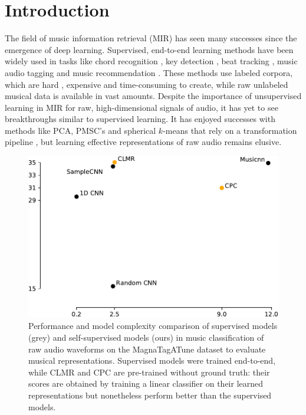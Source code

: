 \chapter{Introduction}\label{sec:introduction}
The field of music information retrieval (MIR) has seen many successes since the emergence of deep learning.
Supervised, end-to-end learning methods have been widely used in tasks like chord recognition \cite{korzeniowski_fully_2016, chen_harmony_2019}, key detection \cite{korzeniowski_end--end_2017}, beat tracking \cite{bock_joint_2016}, music audio tagging \cite{pons_end--end_2017} and music recommendation \cite{van_den_oord_deep_2013}.
These methods use labeled corpora, which are hard \cite{doi:10.1080/09298215.2019.1613436}, expensive and time-consuming to create, while raw unlabeled musical data is available in vast amounts.
Despite the importance of unsupervised learning in MIR for raw, high-dimensional signals of audio, it has yet to see breakthroughs similar to supervised learning.
It has enjoyed successes with methods like PCA, PMSC's and spherical $k$-means that rely on a transformation pipeline \cite{hamel2011temporal, dieleman_feature_learning}, but learning effective representations of raw audio remains elusive.

\begin{figure}[t]
    \centering
    \includegraphics[width=\textwidth]{figs/roc_auc_magnatagatune.pdf}
    \caption{Performance and model complexity comparison of supervised models (grey) and self-supervised models (ours) in music classification of raw audio waveforms on the MagnaTagATune dataset to evaluate musical representations.
Supervised models were trained end-to-end, while CLMR and CPC are pre-trained without ground truth: their scores are obtained by training a linear classifier on their learned representations but nonetheless perform better than the supervised models.}
    \label{fig:example}
\end{figure}

